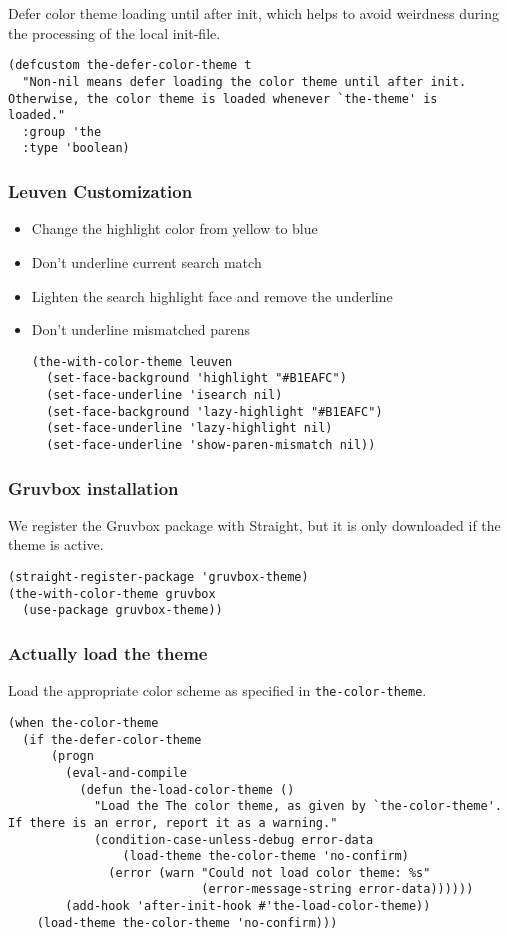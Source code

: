 \documentclass[11pt]{article}
\begin{document}
Defer color theme loading until after init, which helps to avoid
weirdness during the processing of the local init-file.

\begin{verbatim}
(defcustom the-defer-color-theme t
  "Non-nil means defer loading the color theme until after init.
Otherwise, the color theme is loaded whenever `the-theme' is
loaded."
  :group 'the
  :type 'boolean)
\end{verbatim}

\subsubsection{Leuven Customization}
\label{sec:org9afcdef}
\begin{itemize}
\item Change the highlight color from yellow to blue
\item Don't underline current search match
\item Lighten the search highlight face and remove the underline
\item Don't underline mismatched parens

\begin{verbatim}
(the-with-color-theme leuven
  (set-face-background 'highlight "#B1EAFC")
  (set-face-underline 'isearch nil)
  (set-face-background 'lazy-highlight "#B1EAFC")
  (set-face-underline 'lazy-highlight nil)
  (set-face-underline 'show-paren-mismatch nil))
\end{verbatim}
\end{itemize}

\subsubsection{Gruvbox installation}
\label{sec:org8ad71a4}
We register the Gruvbox package with Straight, but it is only
downloaded if the theme is active.
\begin{verbatim}
(straight-register-package 'gruvbox-theme)
(the-with-color-theme gruvbox
  (use-package gruvbox-theme))
\end{verbatim}

\subsubsection{Actually load the theme}
\label{sec:org9400148}
Load the appropriate color scheme as specified in
\texttt{the-color-theme}.
\begin{verbatim}
(when the-color-theme
  (if the-defer-color-theme
      (progn
        (eval-and-compile
          (defun the-load-color-theme ()
            "Load the The color theme, as given by `the-color-theme'.
If there is an error, report it as a warning."
            (condition-case-unless-debug error-data
                (load-theme the-color-theme 'no-confirm)
              (error (warn "Could not load color theme: %s"
                           (error-message-string error-data))))))
        (add-hook 'after-init-hook #'the-load-color-theme))
    (load-theme the-color-theme 'no-confirm)))
\end{verbatim}
\end{document}
